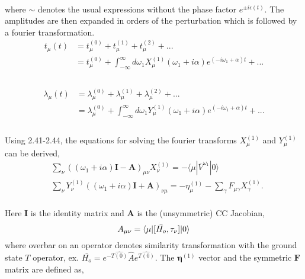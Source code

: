 \\
where $\sim$ denotes the usual expressions without the phase factor $e^{\pm i\epsilon(t)}$. 
The amplitudes are then expanded in orders of the perturbation which is followed by a fourier transformation.
\\
\begin{equation}
\begin{split}
t_\mu(t) &= t^{(0)}_\mu +  t^{(1)}_\mu +  t^{(2)}_\mu + ... \\
&= t^{(0)}_\mu +  \int_{-\infty}^{\infty} d\omega_1 X^{(1)}_\mu(\omega_1 + i\alpha)e^{(-i\omega_1 + \alpha) t}  + ... \\
\end{split}
\end{equation}
\\
\begin{equation}
\begin{split}
\lambda_\mu(t) &= \lambda^{(0)}_\mu +  \lambda^{(1)}_\mu +  \lambda^{(2)}_\mu + ... \\
&= \lambda^{(0)}_\mu +  \int_{-\infty}^{\infty} d\omega_1 Y^{(1)}_\mu(\omega_1 + i\alpha)e^{(-i\omega_1 + \alpha) t}  + ... \\
\end{split}
\end{equation}
\\
Using 2.41-2.44, the equations for solving the fourier transforms 
$X^{(1)}_\mu$ and $Y^{(1)}_\mu$ can be derived, 
\\
\begin{equation}
\begin{split}
&\sum_\nu {((\omega_1 + i\alpha)\bm{I} - \bm{A})}_{\mu\nu} X^{(1)}_{\nu}
= -\langle \mu|\overbar{V}^{\omega_1}|0 \rangle \\
&\sum_\nu Y_{\nu}^{(1)}{((\omega_1 + i\alpha)\bm{I} + \bm{A})}_{\nu\mu} = -\eta^{(1)}_{\mu} -
\sum_{\gamma} F_{\mu\gamma} X^{(1)}_{\gamma}.
\end{split}
\end{equation}
\\
Here $\bm{I}$ is the identity matrix and $\bm{A}$ is the (unsymmetric) CC Jacobian,
\begin{equation}
A_{\mu\nu} = \langle \mu |[\bar{H_o}, \tau_\nu]| 0 \rangle
\end{equation}
where overbar on an operator denotes similarity transformation with the ground state
$T$ operator, ex. $\bar{H_o} = e^{-\hat{T(0)}}\hat{A}e^{\hat{T(0)}}$.
The $\bm{\eta}^{(1)}$ vector and the symmetric $\bm{F}$ matrix are defined as,
\\
